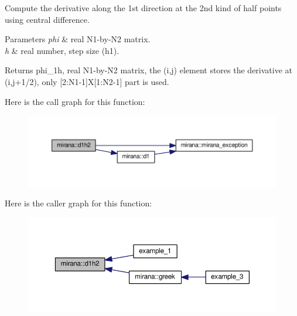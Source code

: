 Compute the derivative along the 1st direction at the 2nd kind of half points using central difference. 


\begin{DoxyParams}{Parameters}
{\em phi} & real N1-\/by-\/\+N2 matrix. \\
\hline
{\em h} & real number, step size (h1). \\
\hline
\end{DoxyParams}
\begin{DoxyReturn}{Returns}
phi\+\_\+1h, real N1-\/by-\/\+N2 matrix, the (i,j) element stores the derivative at (i,j+1/2), only \mbox{[}2\+:N1-\/1\mbox{]}X\mbox{[}1\+:N2-\/1\mbox{]} part is used. 
\end{DoxyReturn}


Here is the call graph for this function\+:\nopagebreak
\begin{figure}[H]
\begin{center}
\leavevmode
\includegraphics[width=350pt]{namespacemirana_a9d6168761271912ebfea872e9f322cdc_cgraph}
\end{center}
\end{figure}




Here is the caller graph for this function\+:\nopagebreak
\begin{figure}[H]
\begin{center}
\leavevmode
\includegraphics[width=350pt]{namespacemirana_a9d6168761271912ebfea872e9f322cdc_icgraph}
\end{center}
\end{figure}


\hypertarget{namespacemirana_a21348ffe170eafc6fc2a009256b1b6e3}{}
